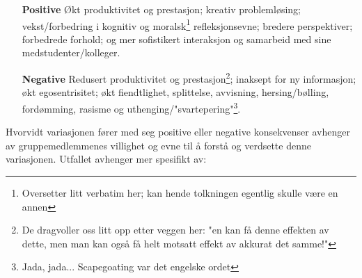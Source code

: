 \documentclass[11pt]{article}
\begin{document}
		\begin{itemize}
			\item[\textbf{Positive}] Økt produktivitet og prestasjon; kreativ problemløsing; vekst/forbedring i kognitiv og moralsk\footnote{Oversetter litt verbatim her; kan hende tolkningen egentlig skulle være en annen} refleksjonsevne; bredere perspektiver; forbedrede forhold; og mer sofistikert interaksjon og samarbeid med sine medstudenter/kolleger.
			
			\item[\textbf{Negative}] Redusert produktivitet og prestasjon\footnote{De dragvoller oss litt opp etter veggen her: "en kan få denne effekten av dette, men man kan også få helt motsatt effekt av akkurat det samme!"}; inaksept for ny informasjon; økt egosentrisitet; økt fiendtlighet, splittelse, avvisning, hersing/bølling, fordømming, rasisme og uthenging/"svartepering"\footnote{Jada, jada... Scapegoating var det engelske ordet}.
		\end{itemize}
		
		Hvorvidt variasjonen fører med seg positive eller negative konsekvenser avhenger av gruppemedlemmenes villighet og evne til å forstå og verdsette denne variasjonen. Utfallet avhenger mer spesifikt av:
		
\end{document}
